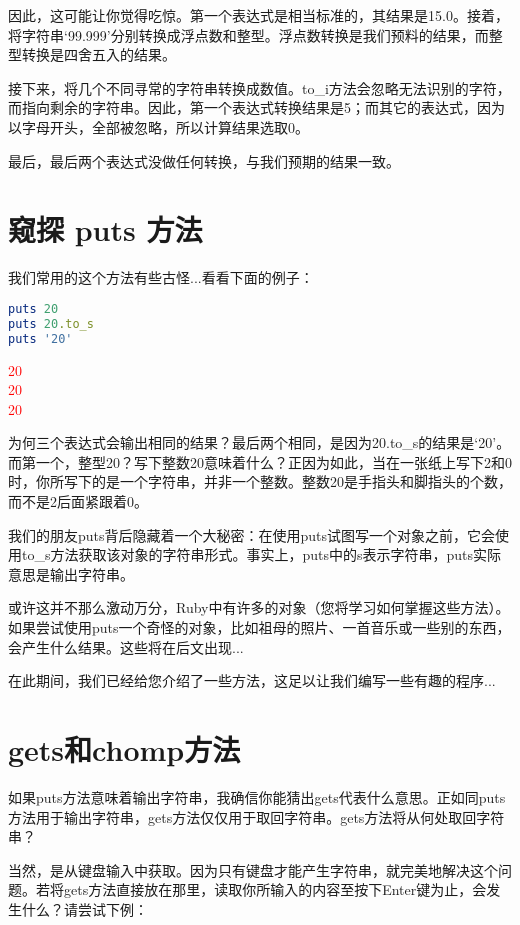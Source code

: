 因此，这可能让你觉得吃惊。第一个表达式是相当标准的，其结果是15.0。接着，将字符串`99.999'分别转换成浮点数和整型。浮点数转换是我们预料的结果，而整型转换是四舍五入的结果。

接下来，将几个不同寻常的字符串转换成数值。to\_i方法会忽略无法识别的字符，而指向剩余的字符串。因此，第一个表达式转换结果是5；而其它的表达式，因为以字母开头，全部被忽略，所以计算结果选取0。

最后，最后两个表达式没做任何转换，与我们预期的结果一致。

\section{窥探 puts 方法}

我们常用的这个方法有些古怪...看看下面的例子：

\begin{lstlisting}[language=ruby]
puts 20
puts 20.to_s
puts '20'
\end{lstlisting}
\textcolor{red}{
20\\
20\\
20
}

为何三个表达式会输出相同的结果？最后两个相同，是因为20.to\_s的结果是`20'。而第一个，整型20？写下整数20意味着什么？正因为如此，当在一张纸上写下2和0时，你所写下的是一个字符串，并非一个整数。整数20是手指头和脚指头的个数，而不是2后面紧跟着0。

我们的朋友puts背后隐藏着一个大秘密：在使用puts试图写一个对象之前，它会使用to\_s方法获取该对象的字符串形式。事实上，puts中的s表示字符串，puts实际意思是输出字符串。

或许这并不那么激动万分，Ruby中有许多的对象（您将学习如何掌握这些方法）。如果尝试使用puts一个奇怪的对象，比如祖母的照片、一首音乐或一些别的东西，会产生什么结果。这些将在后文出现...

在此期间，我们已经给您介绍了一些方法，这足以让我们编写一些有趣的程序...

\section{gets和chomp方法}

如果puts方法意味着输出字符串，我确信你能猜出gets代表什么意思。正如同puts方法用于输出字符串，gets方法仅仅用于取回字符串。gets方法将从何处取回字符串？

当然，是从键盘输入中获取。因为只有键盘才能产生字符串，就完美地解决这个问题。若将gets方法直接放在那里，读取你所输入的内容至按下Enter键为止，会发生什么？请尝试下例：

